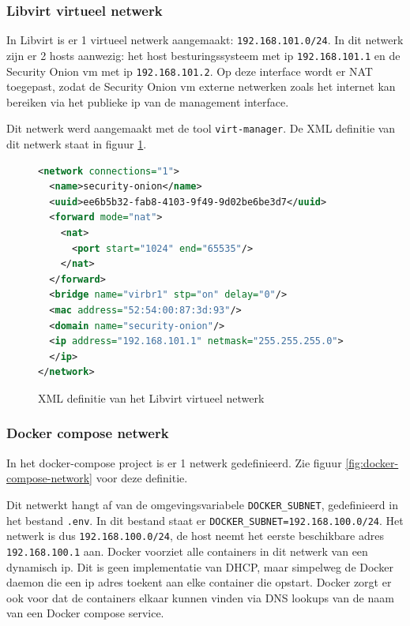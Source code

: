 \documentclass[a4paper, 12pt]{report}
\begin{document}
\subsubsection{Libvirt virtueel netwerk}
In Libvirt is er 1 virtueel netwerk aangemaakt: \lstinline|192.168.101.0/24|.
In dit netwerk zijn er 2 hosts aanwezig: het host besturingssysteem met ip \lstinline|192.168.101.1| en de Security Onion vm met ip \lstinline|192.168.101.2|.
Op deze interface wordt er NAT toegepast, zodat de Security Onion vm externe netwerken zoals het internet kan bereiken via het publieke ip van de management interface.

Dit netwerk werd aangemaakt met de tool \lstinline|virt-manager|.
De XML definitie van dit netwerk staat in figuur \ref{fig:libvirt-network-xml}.

\begin{figure}[H]
  \begin{lstlisting}[language=XML]
<network connections="1">
  <name>security-onion</name>
  <uuid>ee6b5b32-fab8-4103-9f49-9d02be6be3d7</uuid>
  <forward mode="nat">
    <nat>
      <port start="1024" end="65535"/>
    </nat>
  </forward>
  <bridge name="virbr1" stp="on" delay="0"/>
  <mac address="52:54:00:87:3d:93"/>
  <domain name="security-onion"/>
  <ip address="192.168.101.1" netmask="255.255.255.0">
  </ip>
</network>
  \end{lstlisting}
  \caption{XML definitie van het Libvirt virtueel netwerk}
  \label{fig:libvirt-network-xml}
\end{figure}

\subsubsection{Docker compose netwerk}
In het docker-compose project is er 1 netwerk gedefinieerd.
Zie figuur \ref{fig:docker-compose-network} voor deze definitie.

Dit netwerkt hangt af van de omgevingsvariabele \lstinline|DOCKER_SUBNET|, gedefinieerd in het bestand \lstinline|.env|.
In dit bestand staat er \lstinline|DOCKER_SUBNET=192.168.100.0/24|.
Het netwerk is dus \lstinline|192.168.100.0/24|, de host neemt het eerste beschikbare adres \lstinline|192.168.100.1| aan.
Docker voorziet alle containers in dit netwerk van een dynamisch ip.
Dit is geen implementatie van DHCP, maar simpelweg de Docker daemon die een ip adres toekent aan elke container die opstart.
Docker zorgt er ook voor dat de containers elkaar kunnen vinden via DNS lookups van de naam van een Docker compose service. 
\end{document}
